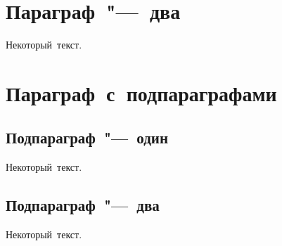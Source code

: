  \section{Параграф "--- два}\label{sec:ch3/sect2} 
  
 Некоторый текст. 
  
 \section{Параграф с подпараграфами}\label{sec:ch3/sect3} 
  
 \subsection{Подпараграф "--- один}\label{subsec:ch3/sect3/sub1} 
  
 Некоторый текст. 
  
 \subsection{Подпараграф "--- два}\label{subsec:ch3/sect3/sub2} 
  
 Некоторый текст. 
  
 \clearpage
